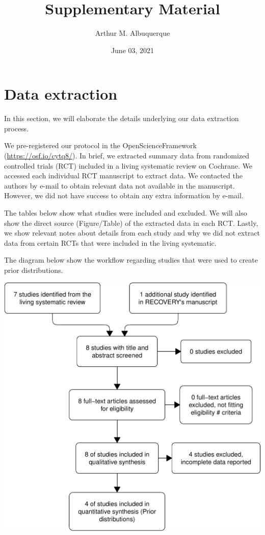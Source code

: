 \documentclass[
]{article}
\title{Supplementary Material}
\author{Arthur M. Albuquerque}
\date{June 03, 2021}
\begin{document}
\maketitle

{
\setcounter{tocdepth}{3}
\tableofcontents
}
\hypertarget{data-extraction}{%
\section{Data extraction}\label{data-extraction}}

In this section, we will elaborate the details underlying our data
extraction process.

We pre-registered our protocol in the OpenScienceFramework
(\url{https://osf.io/cytq8/}). In brief, we extracted summary data from
randomized controlled trials (RCT) included in a living systematic
review on Cochrane. We accessed each individual RCT manuscript to
extract data. We contacted the authors by e-mail to obtain relevant data
not available in the manuscript. However, we did not have success to
obtain any extra information by e-mail.

The tables below show what studies were included and excluded. We will
also show the direct source (Figure/Table) of the extracted data in each
RCT. Lastly, we show relevant notes about details from each study and
why we did not extract data from certain RCTs that were included in the
living systematic.

The diagram below show the workflow regarding studies that were used to
create prior distributions.

\begin{center}\includegraphics[width=0.7\linewidth]{supplementary_files/figure-latex/unnamed-chunk-3-1} \end{center}
\end{document}
